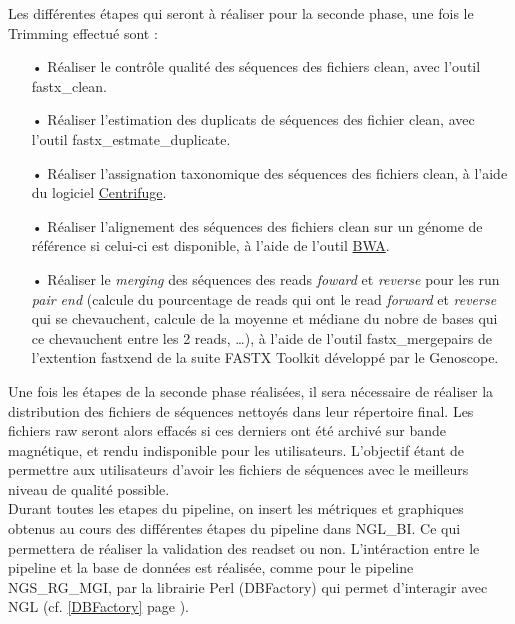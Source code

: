 Les différentes étapes qui seront à réaliser pour la seconde phase, une fois le Trimming effectué sont :\\
\begin{itemize}
    \item[•] Réaliser le contrôle qualité des séquences des fichiers clean, avec l'outil fastx\_clean.
    \item[•] Réaliser l'estimation des duplicats de séquences des fichier clean, avec l'outil fastx\_estmate\_duplicate.
    \item[•] Réaliser l'assignation taxonomique des séquences des fichiers clean, à l'aide du logiciel \href{https://ccb.jhu.edu/software/centrifuge/manual.shtml}{Centrifuge}.
    \item[•] Réaliser l'alignement des séquences des fichiers clean sur un génome de référence si celui-ci est disponible, à l'aide de l'outil \href{http://bio-bwa.sourceforge.net/bwa.shtml}{BWA}.
    \item[•] Réaliser le \og\emph{merging}\fg{} des séquences des reads \emph{foward} et \emph{reverse} pour les run \emph{pair end} (calcule du pourcentage de reads qui ont le read \emph{forward} et \emph{reverse} qui se chevauchent, calcule de la moyenne et médiane du nobre de bases qui ce chevauchent entre les 2 reads, \dots), à l'aide de l'outil fastx\_mergepairs de l'extention fastxend de la suite FASTX Toolkit développé par le Genoscope.\\
\end{itemize}

Une fois les étapes de la seconde phase réalisées, il sera nécessaire de réaliser la distribution des fichiers de séquences nettoyés dans leur répertoire final. Les fichiers raw seront alors effacés si ces derniers ont été archivé sur bande magnétique, et rendu indisponible pour les utilisateurs. L'objectif étant de permettre aux utilisateurs d'avoir les fichiers de séquences avec le meilleurs niveau de qualité possible.\\

Durant toutes les etapes du pipeline, on insert les métriques et graphiques obtenus au cours des différentes étapes du pipeline dans NGL\_BI. Ce qui permettera de réaliser la validation des readset ou non. L'intéraction entre le pipeline et la base de données est réalisée, comme pour le pipeline NGS\_RG\_MGI, par la librairie Perl (DBFactory) qui permet d'interagir avec NGL (cf. \ref{DBFactory} page \pageref{DBFactory}).\\


